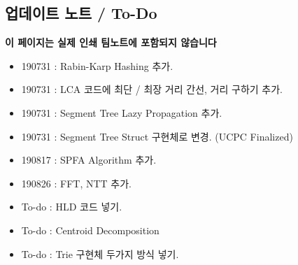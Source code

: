 \documentclass[landscape,8pt]{article}
\begin{document}
\begin{multicols}{2}
\section*{업데이트 노트 / To-Do}
\textbf{이 페이지는 실제 인쇄 팀노트에 포함되지 않습니다}
\begin{itemize}
  \item 190731 : Rabin-Karp Hashing 추가.
  \item 190731 : LCA 코드에 최단 / 최장 거리 간선, 거리 구하기 추가.
  \item 190731 : Segment Tree Lazy Propagation 추가.
  \item 190731 : Segment Tree Struct 구현체로 변경. (UCPC Finalized)
  \item 190817 : SPFA Algorithm 추가.
  \item 190826 : FFT, NTT 추가.
  \item To-do : HLD 코드 넣기.
  \item To-do : Centroid Decomposition
  \item To-do : Trie 구현체 두가지 방식 넣기.
\columnbreak
\end{itemize}
\end{multicols}
\end{document}

